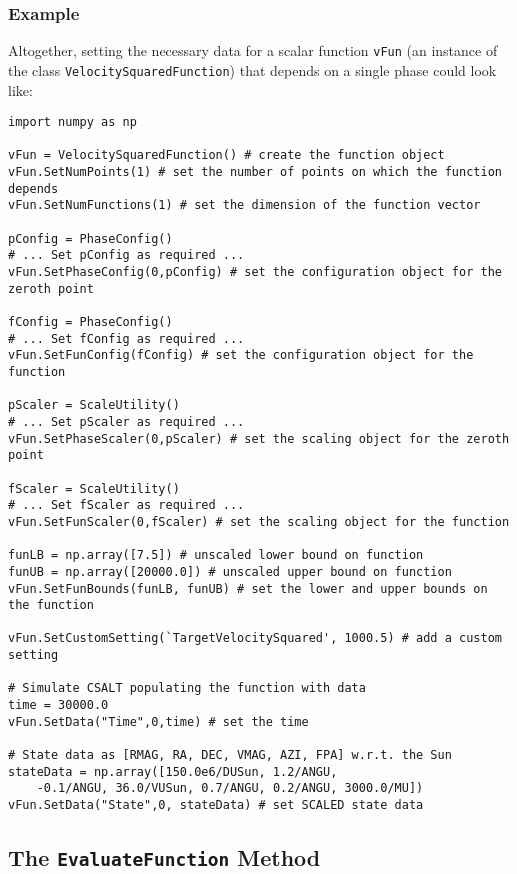\documentclass[]{article}
\begin{document}
\subsubsection{Example}

Altogether, setting the necessary data for a scalar function \texttt{vFun} (an instance of the class \texttt{VelocitySquaredFunction}) that depends on a single phase could look like:

\begin{verbatim}
import numpy as np

vFun = VelocitySquaredFunction() # create the function object
vFun.SetNumPoints(1) # set the number of points on which the function depends
vFun.SetNumFunctions(1) # set the dimension of the function vector

pConfig = PhaseConfig()
# ... Set pConfig as required ...
vFun.SetPhaseConfig(0,pConfig) # set the configuration object for the zeroth point

fConfig = PhaseConfig()
# ... Set fConfig as required ...
vFun.SetFunConfig(fConfig) # set the configuration object for the function

pScaler = ScaleUtility()
# ... Set pScaler as required ...
vFun.SetPhaseScaler(0,pScaler) # set the scaling object for the zeroth point

fScaler = ScaleUtility()
# ... Set fScaler as required ...
vFun.SetFunScaler(0,fScaler) # set the scaling object for the function

funLB = np.array([7.5]) # unscaled lower bound on function
funUB = np.array([20000.0]) # unscaled upper bound on function
vFun.SetFunBounds(funLB, funUB) # set the lower and upper bounds on the function

vFun.SetCustomSetting(`TargetVelocitySquared', 1000.5) # add a custom setting

# Simulate CSALT populating the function with data
time = 30000.0
vFun.SetData("Time",0,time) # set the time

# State data as [RMAG, RA, DEC, VMAG, AZI, FPA] w.r.t. the Sun
stateData = np.array([150.0e6/DUSun, 1.2/ANGU, 
    -0.1/ANGU, 36.0/VUSun, 0.7/ANGU, 0.2/ANGU, 3000.0/MU]) 
vFun.SetData("State",0, stateData) # set SCALED state data
\end{verbatim}

\subsection{The \texttt{EvaluateFunction} Method}
\end{document}
